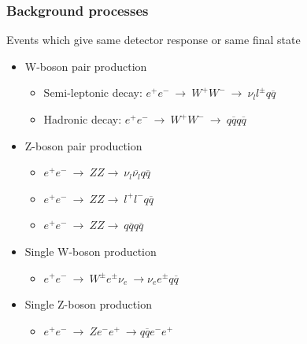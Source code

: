 \documentclass{beamer}
\begin{document}
\begin{frame}
  \frametitle{Background processes}

  {\footnotesize{
    \vspace{-0.3cm}
    \begin{block}{Events which give same detector response or same final state}
      \begin{itemize}
        \item W-boson pair production
          \vspace{-0.1cm}
          \begin{itemize}
            \item Semi-leptonic decay: $e^+e^- \ \rightarrow \ W^+W^- \ \rightarrow \  \nu_l l^{\pm}q\overline{q}$
            \item Hadronic decay: $e^+e^- \ \rightarrow \ W^+W^- \ \rightarrow \  q\overline{q}q\overline{q}$
          \end{itemize}
          \vspace{-0.2cm}
        \item Z-boson pair production
          \vspace{-0.1cm}
          \begin{itemize}
            \item $e^+e^- \ \rightarrow \  ZZ \rightarrow \ \nu_l \overline{\nu_l }q \overline{q}$ 
            \item $e^+e^- \ \rightarrow \  ZZ \rightarrow \ l^+ l^- q \overline{q}$ 
            \item $e^+e^- \ \rightarrow \  ZZ \rightarrow \ q \overline{q} q\overline{q}$ 
          \end{itemize}
          \vspace{-0.2cm}
        \item Single W-boson production
          \vspace{-0.1cm}
          \begin{itemize}
            \item $e^+e^- \ \rightarrow \ W^{\pm} e^{\pm} \nu_e \ \rightarrow \nu_ee^{\pm}q\overline{q}$
          \end{itemize}
          \vspace{-0.2cm}
        \item Single Z-boson production
          \vspace{-0.1cm}
          \begin{itemize}
            \item $e^+e^- \ \rightarrow \ Z e^-e^+ \ \rightarrow q\overline{q}e^-e^+$

\end{itemize}
\end{itemize}
\end{block}}}
\end{frame}
\end{document}

